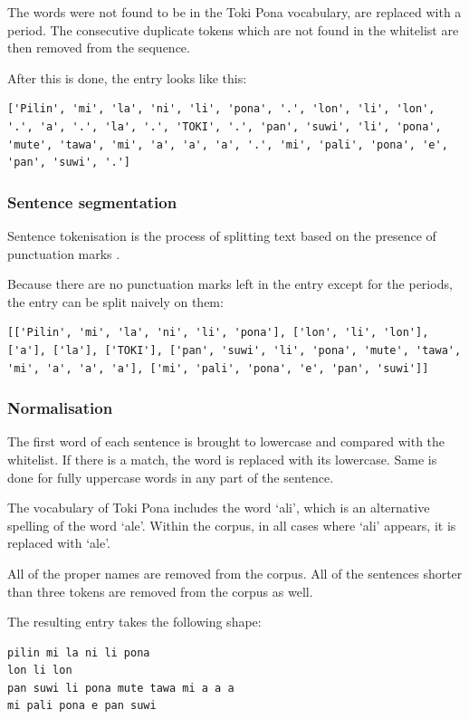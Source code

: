 \documentclass[14pt, a4paper]{extreport}
\begin{document}
The words were not found to be in the Toki Pona vocabulary, are replaced with a period. The consecutive duplicate tokens which are not found in the whitelist are then removed from the sequence.

After this is done, the entry looks like this:

\begin{lstlisting}
['Pilin', 'mi', 'la', 'ni', 'li', 'pona', '.', 'lon', 'li', 'lon', '.', 'a', '.', 'la', '.', 'TOKI', '.', 'pan', 'suwi', 'li', 'pona', 'mute', 'tawa', 'mi', 'a', 'a', 'a', '.', 'mi', 'pali', 'pona', 'e', 'pan', 'suwi', '.']
\end{lstlisting}
      \subsubsection{Sentence segmentation}
Sentence tokenisation is the process of splitting text based on the presence of punctuation marks \parencite[51]{vajjala}.

Because there are no punctuation marks left in the entry except for the periods, the entry can be split naively on them:

\begin{lstlisting}
[['Pilin', 'mi', 'la', 'ni', 'li', 'pona'], ['lon', 'li', 'lon'], ['a'], ['la'], ['TOKI'], ['pan', 'suwi', 'li', 'pona', 'mute', 'tawa', 'mi', 'a', 'a', 'a'], ['mi', 'pali', 'pona', 'e', 'pan', 'suwi']]
\end{lstlisting}
      \subsubsection{Normalisation}
The first word of each sentence is brought to lowercase and compared with the whitelist. If there is a match, the word is replaced with its lowercase. Same is done for fully uppercase words in any part of the sentence.

The vocabulary of Toki Pona includes the word `ali', which is an alternative spelling of the word `ale'. Within the corpus, in all cases where `ali' appears, it is replaced with `ale'.

All of the proper names are removed from the corpus. All of the sentences shorter than three tokens are removed from the corpus as well.

The resulting entry takes the following shape:

\begin{lstlisting}
pilin mi la ni li pona
lon li lon
pan suwi li pona mute tawa mi a a a
mi pali pona e pan suwi
\end{lstlisting}
\end{document}
